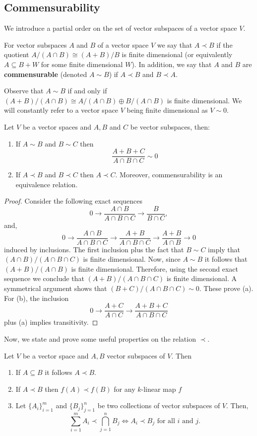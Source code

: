\subsection{Commensurability}
We introduce a partial order on the set of vector subspaces of a vector space $V$.
\begin{definition}\label{def:commensurability}
	For vector subspaces $A$ and $B$ of a vector space $V$ we say that $A \prec B$ if the quotient $A/(A\cap B) \cong (A+B)/B$ is finite dimensional (or equivalently $A \subseteq B + W$ for some finite dimensional $W$). In addition, we say that $A$ and $B$ are \textbf{commensurable} (denoted $A \sim B$) if $A \prec B$ and $B \prec A$.
\end{definition}
Observe that $A \sim B$ if and only if $(A+B)/(A\cap B) \cong A/(A\cap B) \oplus B/(A \cap B)$ is finite dimensional. We will constantly refer to a vector space $V$ being finite dimensional as $V \sim 0$.
\begin{proposition}\label{prop:equivalence-relation}
	Let $V$ be a vector spaces and $A,B$ and $C$ be vector subspaces, then:
	\begin{enumerate}[label = (\alph*)]
		\item If $A \sim B$ and $B \sim C$ then
		\[
			\frac{A+B+C}{A \cap B \cap C} \sim 0
		\]
		\item If $A \prec B$ and $B \prec C$ then $A \prec C$. Moreover, commensurability is an equivalence relation.
	\end{enumerate}
\end{proposition}
\begin{proof}
	Consider the following exact sequences
	\[
		0 \to \frac{A\cap B}{A \cap B \cap C} \to \frac{B}{B \cap C}, 
	\]
	and,
	\[
		0 \to \frac{A\cap B}{A \cap B \cap C} \to \frac{A+B}{A \cap B \cap C}
		\to \frac{A+B}{A \cap B} \to 0
	\]
	induced by inclusions. The first inclusion plus the fact that $B \sim C$ imply that $(A\cap B)/(A \cap B \cap C)$ is finite dimensional. Now, since $A \sim B$ it follows that $(A+B)/(A \cap B)$ is finite dimensional. Therefore, using the second exact sequence we conclude that $(A+B)/(A \cap B \cap C)$ is finite dimensional. A symmetrical argument shows that $(B+C)/(A \cap B \cap C) \sim 0$. These prove (a). For (b), the inclusion
	\[
		0 \to \frac{A+C}{A\cap C} \to \frac{A+B+C}{A \cap B \cap C}
	\]
	plus (a) implies transitivity. 
\end{proof}
Now, we state and prove some useful properties on the relation $\prec$.
\begin{lemma}\label{lemm:properties-order-well-behaved-under-operations}
Let $V$ be a vector space and $A,B$ vector subspaces of $V$. Then
\begin{enumerate}[label = (\alph*)]
	\item If $A \subseteq B$ it follows $A \prec B$.
	\item If $A \prec B$ then $f(A) \prec f(B)$ for any $k$-linear map $f$
	\item Let $\{A_{i}\}_{i=1}^{m}$ and $\{B_{j}\}_{j=1}^{n}$ be two collections of vector subspaces of $V$. Then,
	\[
		\sum_{i=1}^{m} A_{i} \prec \bigcap_{j=1}^{n} B_{j} \iff A_{i} \prec B_{j}\text{  for all } i \text{ and } j.
	\]
\end{enumerate}
\end{lemma}
